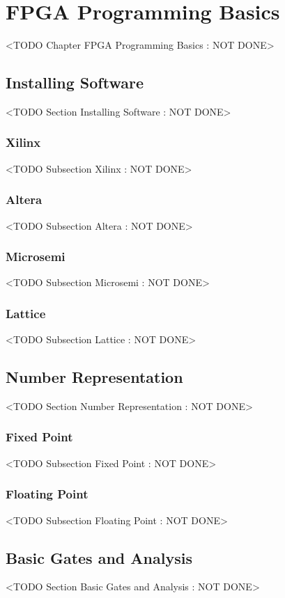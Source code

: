 \chapter{FPGA Programming Basics}
	<TODO Chapter FPGA Programming Basics : NOT DONE>

\section{Installing Software}
	<TODO Section Installing Software : NOT DONE>

\subsection{Xilinx}
	<TODO Subsection Xilinx : NOT DONE>

\subsection{Altera}
	<TODO Subsection Altera : NOT DONE>

\subsection{Microsemi}
	<TODO Subsection Microsemi : NOT DONE>

\subsection{Lattice}
	<TODO Subsection Lattice : NOT DONE>

\section{Number Representation}
	<TODO Section Number Representation : NOT DONE>

\subsection{Fixed Point}
	<TODO Subsection Fixed Point : NOT DONE>

\subsection{Floating Point}
	<TODO Subsection Floating Point : NOT DONE>

\section{Basic Gates and Analysis}
	<TODO Section Basic Gates and Analysis : NOT DONE>

